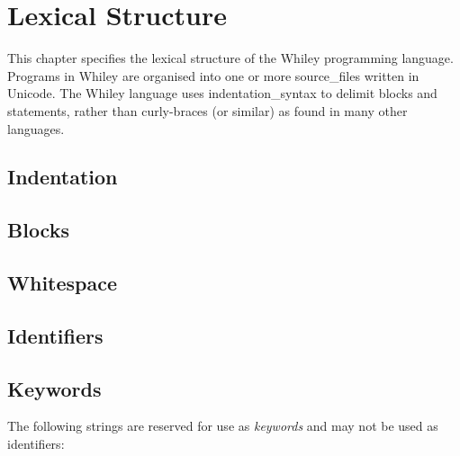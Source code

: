 \chapter{Lexical Structure}

This chapter specifies the lexical structure of the Whiley programming language.  Programs in Whiley are organised into one or more \gls{source_file}s written in Unicode.  The Whiley language uses \gls{indentation_syntax} to delimit blocks and statements, rather than curly-braces (or similar) as found in many other languages.  

\section{Indentation}
\section{Blocks}
\section{Whitespace}
\section{Identifiers}
\section{Keywords}
The following strings are reserved for use as {\em keywords} and may not be used as identifiers:

